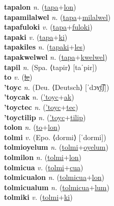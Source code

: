 \textbf{tapalon} \textit{n.} (\hyperref[tapa]{tapa}+\hyperref[lon]{lon})
 \label{tapalon} \\
\textbf{tapamilalwel} \textit{n.} (\hyperref[tapa]{tapa}+\hyperref[milalwel]{milalwel})
 \label{tapamilalwel} \\
\textbf{tapafuloki} \textit{v.} (\hyperref[tapa]{tapa}+\hyperref[fuloki]{fuloki})
 \label{tapafuloki} \\
\textbf{tapaki} \textit{v.} (\hyperref[tapa]{tapa}+\hyperref[ki]{ki})
 \label{tapaki} \\
\textbf{tapakiles} \textit{n.} (\hyperref[tapaki]{tapaki}+\hyperref[les]{les})
 \label{tapakiles} \\
\textbf{tapakwelwel} \textit{n.} (\hyperref[tapa]{tapa}+\hyperref[kwelwel]{kwelwel})
 \label{tapakwelwel} \\
\textbf{tapil} \textit{n.} (Spa. ⟨tapir⟩ [taˈpir])
 \label{tapil} \\
\textbf{to} \textit{v.} (\hyperref[le]{\sout{le}})
 \label{to} \\
\textbf{'toyc} \textit{n.} (Deu. ⟨Deutsch⟩ [ˈdɔʏ̯t͡ʃ])
 \label{'toyc} \\
\textbf{'toycak} \textit{n.} (\hyperref['toyc]{'toyc}+\hyperref[ak]{ak})
 \label{'toycak} \\
\textbf{'toyctec} \textit{n.} (\hyperref['toyc]{'toyc}+\hyperref[tec]{tec})
 \label{'toyctec} \\
\textbf{'toyctilip} \textit{n.} (\hyperref['toyc]{'toyc}+\hyperref[tilip]{tilip})
 \label{'toyctilip} \\
\textbf{tolon} \textit{n.} (\hyperref[to]{to}+\hyperref[lon]{lon})
 \label{tolon} \\
\textbf{tolmi} \textit{v.} (Epo. ⟨dormi⟩ [ˈdormi])
 \label{tolmi} \\
\textbf{tolmioyelum} \textit{n.} (\hyperref[tolmi]{tolmi}+\hyperref[oyelum]{oyelum})
 \label{tolmioyelum} \\
\textbf{tolmilon} \textit{n.} (\hyperref[tolmi]{tolmi}+\hyperref[lon]{lon})
 \label{tolmilon} \\
\textbf{tolmicua} \textit{v.} (\hyperref[tolmi]{tolmi}+\hyperref[cua]{cua})
 \label{tolmicua} \\
\textbf{tolmicualon} \textit{n.} (\hyperref[tolmicua]{tolmicua}+\hyperref[lon]{lon})
 \label{tolmicualon} \\
\textbf{tolmicualum} \textit{n.} (\hyperref[tolmicua]{tolmicua}+\hyperref[lum]{lum})
 \label{tolmicualum} \\
\textbf{tolmiki} \textit{v.} (\hyperref[tolmi]{tolmi}+\hyperref[ki]{ki})
